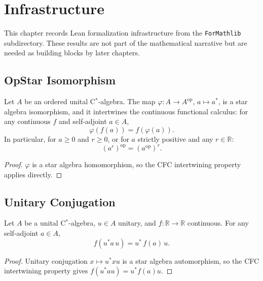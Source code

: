 \chapter{Infrastructure}

This chapter records Lean formalization infrastructure from the \texttt{ForMathlib}
subdirectory.  These results are not part of the mathematical narrative but are needed
as building blocks by later chapters.

\section{OpStar Isomorphism}

\begin{proposition}
  \label{prop:opstar_cfc}
  \leanok
  Let $A$ be an ordered unital C$^*$-algebra.  The map
  $\varphi : A \to A^{\mathrm{op}}$, $a \mapsto a^*$, is a star algebra
  isomorphism, and it intertwines the continuous functional calculus:
  for any continuous $f$ and self-adjoint $a \in A$,
  \[
    \varphi(f(a)) = f(\varphi(a)).
  \]
  In particular, for $a \geq 0$ and $r \geq 0$, or for $a$ strictly positive and any
  $r \in \mathbb{R}$:
  \[
    (a^r)^{\mathrm{op}} = (a^{\mathrm{op}})^r.
  \]
  \begin{proof}
    \leanok
    $\varphi$ is a star algebra homomorphism, so the CFC intertwining property applies
    directly.
  \end{proof}
\end{proposition}

\section{Unitary Conjugation}

\begin{theorem}
  \label{thm:cfc_unitary_conj}
  \leanok
  Let $A$ be a unital C$^*$-algebra, $u \in A$ unitary, and $f : \mathbb{R} \to \mathbb{R}$
  continuous.  For any self-adjoint $a \in A$,
  \[
    f(u^* a\, u) = u^*\, f(a)\, u.
  \]
  \begin{proof}
    \leanok
    Unitary conjugation $x \mapsto u^* x u$ is a star algebra automorphism, so the
    CFC intertwining property gives $f(u^* a u) = u^* f(a) u$.
  \end{proof}
\end{theorem}

